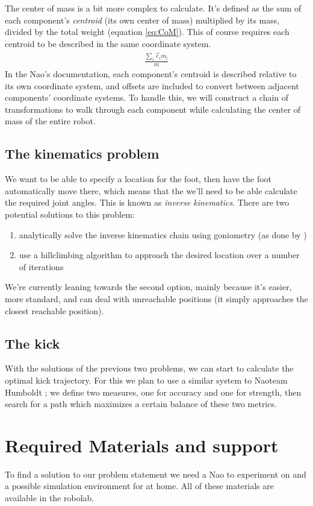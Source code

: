 \documentclass[a4paper]{article}
\begin{document}
The center of mass is a bit more complex to calculate. It’s defined as the sum
of each component’s \emph{centroid} (its own center of mass) multiplied by its
mass, divided by the total weight (equation \ref{eq:CoM}). This of course
requires each centroid to be described in the same coordinate system.
\begin{align}
  \frac{\sum_i \vec{c}_i m_i} {m}        \label{eq:CoM}
\end{align}
In the Nao’s documentation, each component’s centroid is described relative to
its own coordinate system, and offsets are included to convert between adjacent
components’ coordinate systems. To handle this, we will construct a chain of
transformations to walk through each component while calculating the center of
mass of the entire robot.

\subsection{The kinematics problem}
We want to be able to specify a location for the foot, then have the foot
automatically move there, which means that the we’ll need to be able calculate
the required joint angles. This is known as \emph{inverse kinematics}. There are
two potential solutions to this problem:
\begin{enumerate}
  \item analytically solve the inverse kinematics chain using goniometry (as done by \cite{Graf2009})
\item use a hillclimbing algorithm to approach the desired location over a number of iterations
\end{enumerate}

We’re currently leaning towards the second option, mainly because it’s easier,
more standard, and can deal with unreachable positions (it simply approaches the
closest reachable position).

\subsection{The kick}
With the solutions of the previous two problems, we can start to calculate the
optimal kick trajectory. For this we plan to use a similar system to Naoteam
Humboldt \cite{Muller2011}; we define two measures, one for accuracy and one for
strength, then search for a path which maximizes a certain balance of these two
metrics. 



\section{Required Materials and support} 
To find a solution to our problem statement we need a Nao to experiment on and a
possible simulation environment for at home. All of these materials are
available in the robolab.
\end{document}
